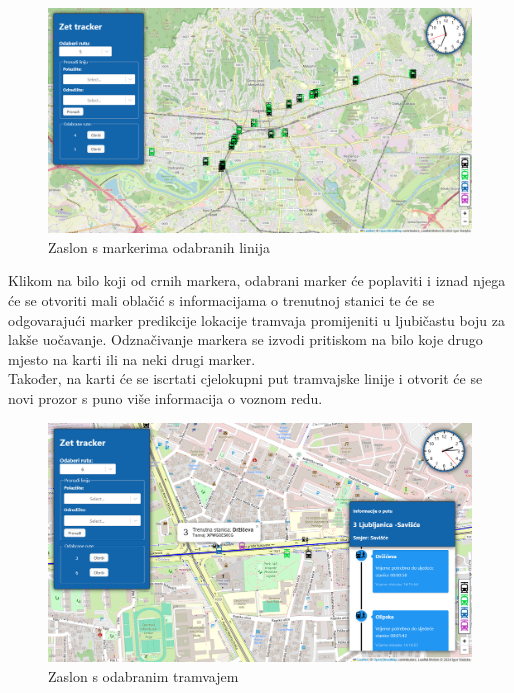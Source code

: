 \documentclass[zavrsnirad]{fer}
\begin{document}
\begin{figure}[H]
	\centering
	\includegraphics[width=\linewidth]{Figures/odabrantram.png} 
	\caption{Zaslon s markerima odabranih linija}
	\label{slk:zaslonmark}
\end{figure}
Klikom na bilo koji od crnih markera, odabrani marker će poplaviti i iznad njega će se otvoriti mali oblačić s informacijama o trenutnoj stanici te će se odgovarajući marker predikcije lokacije tramvaja promijeniti u ljubičastu boju za lakše uočavanje. Odznačivanje markera se izvodi pritiskom na bilo koje drugo mjesto na karti ili na neki drugi marker.\\
Također, na karti će se iscrtati cjelokupni put tramvajske linije i otvorit će se novi prozor s puno više informacija o voznom redu.
\begin{figure}[H]
	\centering
	\includegraphics[width=\linewidth]{Figures/tram1.png} 
	\caption{Zaslon s odabranim tramvajem}
	\label{slk:tramodabran}
\end{figure}
\end{document}
